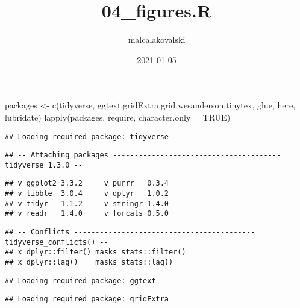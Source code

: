 \documentclass[
]{article}
\title{04\_figures.R}
\author{malcalakovalski}
\date{2021-01-05}
\newenvironment{Shaded}{\begin{snugshade}}{\end{snugshade}}
\newcommand{\AttributeTok}[1]{\textcolor[rgb]{0.77,0.63,0.00}{#1}}
\newcommand{\ConstantTok}[1]{\textcolor[rgb]{0.00,0.00,0.00}{#1}}
\newcommand{\FunctionTok}[1]{\textcolor[rgb]{0.00,0.00,0.00}{#1}}
\newcommand{\NormalTok}[1]{#1}
\newcommand{\OtherTok}[1]{\textcolor[rgb]{0.56,0.35,0.01}{#1}}
\newcommand{\StringTok}[1]{\textcolor[rgb]{0.31,0.60,0.02}{#1}}
\begin{document}
\maketitle

\begin{Shaded}
\begin{Highlighting}[]
\NormalTok{packages }\OtherTok{\textless{}{-}} 
  \FunctionTok{c}\NormalTok{(}\StringTok{\textquotesingle{}tidyverse\textquotesingle{}}\NormalTok{, }\StringTok{\textquotesingle{}ggtext\textquotesingle{}}\NormalTok{,}\StringTok{\textquotesingle{}gridExtra\textquotesingle{}}\NormalTok{,}\StringTok{\textquotesingle{}grid\textquotesingle{}}\NormalTok{,}\StringTok{\textquotesingle{}wesanderson\textquotesingle{}}\NormalTok{,}\StringTok{\textquotesingle{}tinytex\textquotesingle{}}\NormalTok{, }\StringTok{\textquotesingle{}glue\textquotesingle{}}\NormalTok{, }\StringTok{\textquotesingle{}here\textquotesingle{}}\NormalTok{,}
    \StringTok{\textquotesingle{}lubridate\textquotesingle{}}\NormalTok{)}
\FunctionTok{lapply}\NormalTok{(packages, require, }\AttributeTok{character.only =} \ConstantTok{TRUE}\NormalTok{)}
\end{Highlighting}
\end{Shaded}

\begin{verbatim}
## Loading required package: tidyverse
\end{verbatim}

\begin{verbatim}
## -- Attaching packages --------------------------------------- tidyverse 1.3.0 --
\end{verbatim}

\begin{verbatim}
## v ggplot2 3.3.2     v purrr   0.3.4
## v tibble  3.0.4     v dplyr   1.0.2
## v tidyr   1.1.2     v stringr 1.4.0
## v readr   1.4.0     v forcats 0.5.0
\end{verbatim}

\begin{verbatim}
## -- Conflicts ------------------------------------------ tidyverse_conflicts() --
## x dplyr::filter() masks stats::filter()
## x dplyr::lag()    masks stats::lag()
\end{verbatim}

\begin{verbatim}
## Loading required package: ggtext
\end{verbatim}

\begin{verbatim}
## Loading required package: gridExtra
\end{verbatim}
\end{document}
